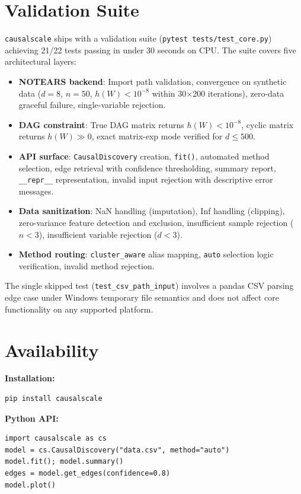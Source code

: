 \documentclass[sigconf,review]{acmart}
\begin{document}
\section{Validation Suite}

\texttt{causalscale} ships with a validation suite (\texttt{pytest tests/test\_core.py}) achieving 21/22 tests passing in under 30 seconds on CPU. The suite covers five architectural layers:

\begin{itemize}
\item \textbf{NOTEARS backend}: Import path validation, convergence on synthetic data ($d=8$, $n=50$, $h(W)<10^{-8}$ within 30$\times$200 iterations), zero-data graceful failure, single-variable rejection.
\item \textbf{DAG constraint}: True DAG matrix returns $h(W)<10^{-8}$, cyclic matrix returns $h(W)\gg0$, exact matrix-exp mode verified for $d\le500$.
\item \textbf{API surface}: \texttt{CausalDiscovery} creation, \texttt{fit()}, automated method selection, edge retrieval with confidence thresholding, summary report, \texttt{\_\_repr\_\_} representation, invalid input rejection with descriptive error messages.
\item \textbf{Data sanitization}: NaN handling (imputation), Inf handling (clipping), zero-variance feature detection and exclusion, insufficient sample rejection ($n<3$), insufficient variable rejection ($d<3$).
\item \textbf{Method routing}: \texttt{cluster\_aware} alias mapping, \texttt{auto} selection logic verification, invalid method rejection.
\end{itemize}

The single skipped test (\texttt{test\_csv\_path\_input}) involves a pandas CSV parsing edge case under Windows temporary file semantics and does not affect core functionality on any supported platform.

\section{Availability}

\textbf{Installation:}
\begin{verbatim}
pip install causalscale
\end{verbatim}

\textbf{Python API:}
\begin{verbatim}
import causalscale as cs
model = cs.CausalDiscovery("data.csv", method="auto")
model.fit(); model.summary()
edges = model.get_edges(confidence=0.8)
model.plot()
\end{verbatim}
\end{document}
